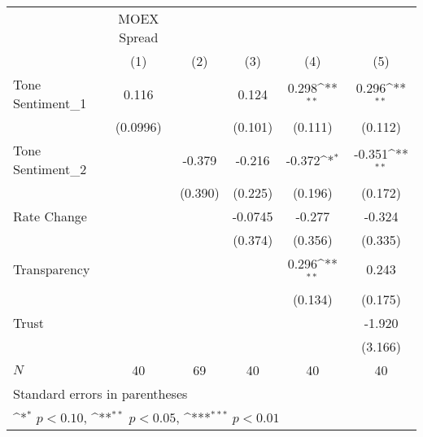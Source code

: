 {
\def\sym#1{\ifmmode^{#1}\else\(^{#1}\)\fi}
\begin{tabular}{l*{5}{c}}
\hline\hline
            & MOEX Spread         &                     &                     &                     &                     \\
            &\multicolumn{1}{c}{(1)}         &\multicolumn{1}{c}{(2)}         &\multicolumn{1}{c}{(3)}         &\multicolumn{1}{c}{(4)}         &\multicolumn{1}{c}{(5)}         \\
\hline
Tone Sentiment\_{1}&       0.116         &                     &       0.124         &       0.298\sym{**} &       0.296\sym{**} \\
            &    (0.0996)         &                     &     (0.101)         &     (0.111)         &     (0.112)         \\
[1em]
Tone Sentiment\_{2}&                     &      -0.379         &      -0.216         &      -0.372\sym{*}  &      -0.351\sym{**} \\
            &                     &     (0.390)         &     (0.225)         &     (0.196)         &     (0.172)         \\
[1em]
Rate Change &                     &                     &     -0.0745         &      -0.277         &      -0.324         \\
            &                     &                     &     (0.374)         &     (0.356)         &     (0.335)         \\
[1em]
Transparency&                     &                     &                     &       0.296\sym{**} &       0.243         \\
            &                     &                     &                     &     (0.134)         &     (0.175)         \\
[1em]
Trust       &                     &                     &                     &                     &      -1.920         \\
            &                     &                     &                     &                     &     (3.166)         \\
\hline
\(N\)       &          40         &          69         &          40         &          40         &          40         \\
\hline\hline
\multicolumn{6}{l}{\footnotesize Standard errors in parentheses}\\
\multicolumn{6}{l}{\footnotesize \sym{*} \(p<0.10\), \sym{**} \(p<0.05\), \sym{***} \(p<0.01\)}\\
\end{tabular}
}
